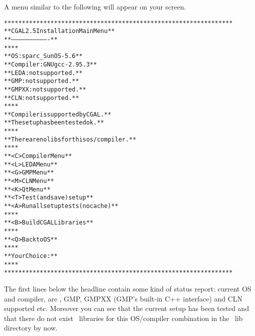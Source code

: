 A menu similar to the following will appear on your screen.

{\ccTexHtml{\scriptsize}{} \label{pic:main-menu}
\begin{alltt}
  ****************************************************************
  **              CGAL 2.5 Installation Main Menu               **
  **              -------------------------------               **
  **                                                            **
  **   OS:                  sparc_SunOS-5.6                     **
  **   Compiler:            GNU gcc-2.95.3                      **
  **   LEDA:                not supported.                      **
  **   GMP:                 not supported.                      **
  **   GMPXX:               not supported.                      **
  **   CLN:                 not supported.                      **
  **                                                            **
  **   Compiler is supported by CGAL.                           **
  **   The setup has been tested ok.                            **
  **                                                            **
  **   There are no libs for this os/compiler.                  **
  **                                                            **
  **   <C>  Compiler Menu                                       **
  **   <L>  LEDA Menu                                           **
  **   <G>  GMP Menu                                            **
  **   <M>  CLN Menu                                            **
  **   <K>  Qt Menu                                             **
  **   <T>  Test (and save) setup                               **
  **   <A>  Run all setup tests (no cache)                      **
  **                                                            **
  **   <B>  Build CGAL Libraries                                **
  **                                                            **
  **   <Q>  Back to OS                                          **
  **                                                            **
  **   Your Choice:                                             **
  **                                                            **
  ****************************************************************
\end{alltt}}

The first lines below the headline contain some kind of status report:
current OS and compiler, are \leda, GMP, GMPXX (GMP's built-in C++ interface)
and CLN supported etc.
Moreover you can see that the current setup has been tested and that
there do not exist \cgal\ libraries for this OS/compiler combination
in the \cgal\ lib directory by now.

